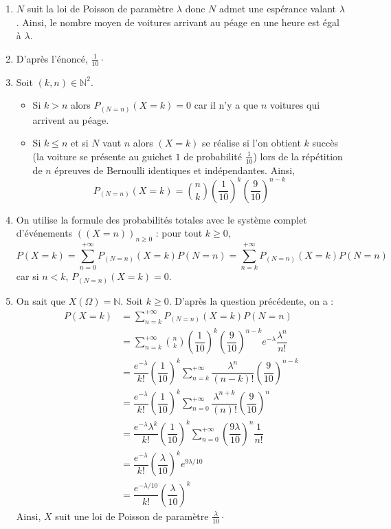 \documentclass[a4paper,twoside,french,11pt]{VcCours}
\begin{document}
\begin{enumerate}
\item $N$ suit la loi de Poisson de paramètre $\lambda$ donc $N$ admet une espérance valant $\lambda$. Ainsi,  le nombre moyen de voitures arrivant au péage en une heure est égal à $\lambda$.
\item D'après l'énoncé, $\tfrac{1}{10} \cdot$ 
\item Soit $(k,n) \in \mathbb{N}^2$.
\begin{itemize}
\item Si $k>n$ alors $P_{(N=n)}(X=k) = 0$ car il n'y a que $n$ voitures qui arrivent au péage.
\item Si $k \leq n$ et si $N$ vaut $n$ alors $(X=k)$ se réalise si l'on obtient $k$ succès (\og la voiture se présente au guichet $1$ \fg{} de probabilité $\tfrac{1}{10}$) lors de la répétition de $n$ épreuves de Bernoulli identiques et indépendantes. Ainsi,
$$ P_{(N=n)}(X=k) = \binom{n}{k} \left( \dfrac{1}{10} \right)^k  \left( \dfrac{9}{10} \right)^{n-k}$$
\end{itemize}

\item On utilise la formule des probabilités totales avec le système complet d'événements $((X=n))_{n \geq 0}$ : pour tout $k \geq 0$,
$$ P(X=k)=\sum_{n=0}^{+\infty}P_{(N=n)}(X=k) P(N=n) =\sum_{n=k}^{+\infty}P_{(N=n)}(X=k) P(N=n)$$
car si $n<k$, $P_{(N=n)}(X=k)=0$.
\item On sait que $X(\Omega) = \mathbb{N}$. Soit $k \geq 0$. D'après la question précédente, on a :
\begin{align*}
P(X=k) & = \sum_{n=k}^{+\infty}P_{(N=n)}(X=k) P(N=n) \\
& = \sum_{n=k}^{+\infty} \binom{n}{k}  \left( \dfrac{1}{10} \right)^k  \left( \dfrac{9}{10} \right)^{n-k} e^{- \lambda} \dfrac{\lambda^n}{n!} \\
& = \dfrac{e^{-\lambda}}{k!}\left( \dfrac{1}{10} \right)^k \sum_{n=k}^{+\infty} \dfrac{\lambda^n}{(n-k)!} \left( \dfrac{9}{10} \right)^{n-k} \\
& = \dfrac{e^{-\lambda}}{k!}\left( \dfrac{1}{10} \right)^k \sum_{n=0}^{+\infty} \dfrac{\lambda^{n+k}}{(n)!} \left( \dfrac{9}{10} \right)^{n} \\
& =  \dfrac{e^{-\lambda} \lambda^k }{k!}\left( \dfrac{1}{10} \right)^k \sum_{n=0}^{+\infty} \left( \dfrac{9 \lambda}{10} \right)^n \dfrac{1}{n!} \\
& = \dfrac{e^{-\lambda}}{k!}\left( \dfrac{\lambda}{10} \right)^k e^{9 \lambda/10} \\
& =  \dfrac{e^{-\lambda/10}}{k!}\left( \dfrac{\lambda}{10} \right)^k
\end{align*}
Ainsi, $X$ suit une loi de Poisson de paramètre $\tfrac{\lambda}{10} \cdot$
\end{enumerate}
\end{document}
